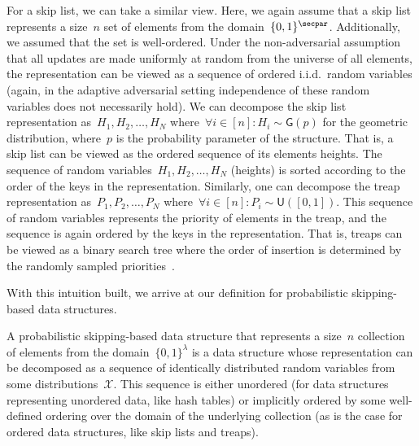 For a skip list, we can take a similar view. Here, we again assume that a skip list represents a size~$n$ set of elements from the domain~$\{0,1\}^\secpar$. Additionally, we assumed that the set is well-ordered. Under the non-adversarial assumption that all updates are made uniformly at random from the universe of all elements, the representation can be viewed as a sequence of ordered i.i.d.~random variables (again, in the adaptive adversarial setting independence of these random variables does not necessarily hold). We can decompose the skip list representation as~$H_1,H_2,\ldots,H_N$ where~$\forall i \in [n] : H_{i} \sim \mathsf{G}(p)$ for the geometric distribution, where~$p$ is the probability parameter of the structure. That is, a skip list can be viewed as the ordered sequence of its elements heights. The sequence of random variables~$H_1,H_2,\ldots,H_N$ (heights) is sorted according to the order of the keys in the representation. Similarly, one can decompose the treap representation as~$P_1,P_2,\ldots,P_N$ where~$\forall i \in [n] : P_{i} \sim \mathsf{U}([0,1])$.  This sequence of random variables represents the priority of elements in the treap, and the sequence is again ordered by the keys in the representation. That is, treaps can be viewed as a binary search tree where the order of insertion is determined by the randomly sampled priorities~\cite{seidel1996randomized}. 

With this intuition built, we arrive at our definition for probabilistic skipping-based data structures. 

\begin{definition}
\label{def:sbds}
A probabilistic skipping-based data structure that represents a size~$n$ collection of elements from the domain~$\{0,1\}^\lambda$ is a data structure whose representation can be decomposed as a sequence of identically distributed random variables from some distributions~$\mathcal{X}$. This sequence is either unordered (for data structures representing unordered data, like hash tables) or implicitly ordered by some well-defined ordering over the domain of the underlying collection (as is the case for ordered data structures, like skip lists and treaps). 
\end{definition}

